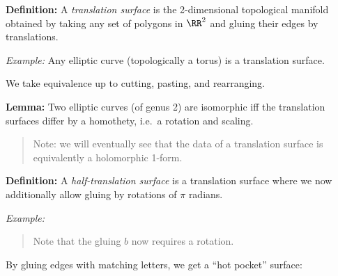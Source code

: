 \textbf{Definition:} A \emph{translation surface} is the 2-dimensional
topological manifold obtained by taking any set of polygons in \(\RR^2\)
and gluing their edges by translations.

\emph{Example:} Any elliptic curve (topologically a torus) is a
translation surface.

We take equivalence up to cutting, pasting, and rearranging.

\textbf{Lemma:} Two elliptic curves (of genus 2) are isomorphic iff the
translation surfaces differ by a homothety, i.e.~a rotation and scaling.

\begin{quote}
Note: we will eventually see that the data of a translation surface is
equivalently a holomorphic 1-form.
\end{quote}

\textbf{Definition:} A \emph{half-translation surface} is a translation
surface where we now additionally allow gluing by rotations of \(\pi\)
radians.

\emph{Example:}

\begin{center}
\end{center}

\begin{quote}
Note that the gluing \(b\) now requires a rotation.
\end{quote}

By gluing edges with matching letters, we get a ``hot pocket'' surface:

